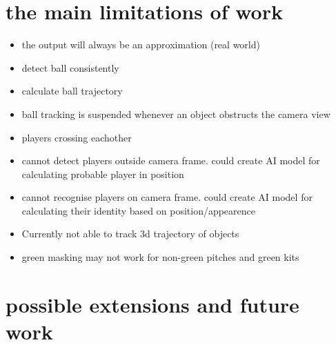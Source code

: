 \documentclass[
11pt,
twoside
]{report}
\begin{document}
\section{the main limitations of work}

\begin{itemize}
\item
  the output will always be an approximation (real world)
\item
  detect ball consistently
\item
  calculate ball trajectory
\item
  ball tracking is suspended whenever an object obstructs the camera
  view
\item
  players crossing eachother
\item
  cannot detect players outside camera frame. could create AI model for
  calculating probable player in position
\item
  cannot recognise players on camera frame. could create AI model for
  calculating their identity based on position/appearence
\item
  Currently not able to track 3d trajectory of objects
\item
  green masking may not work for non-green pitches and green kits
\end{itemize}



\section{possible extensions and future work}
\end{document}
